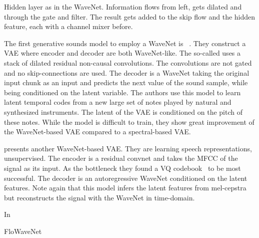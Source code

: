 \begin{marginfigure}
    
    \caption{Hidden layer as in the WaveNet. Information flows from left, gets dilated and through the gate and filter. The result gets added to the skip flow and the hidden feature, each with a channel mixer before.}%
    \label{fig:wavenet_layer}
\end{marginfigure}


The first generative sounds model to employ a WaveNet is ~\cite{kalchbrennerEfficient2018}. They construct a VAE where encoder and decoder are both WaveNet-like. The so-called  uses a stack of dilated residual non-causal convolutions. The convolutions are not gated and no skip-connections are used. The decoder is a WaveNet taking the original input chunk as an input and predicts the next value of the sound sample, while being conditioned on the latent variable. The authors use this model to learn latent temporal codes from a new large set of notes played by natural and synthesized instruments. The latent of the VAE is conditioned on the pitch of these notes. While the model is difficult to train, they show great improvement of the WaveNet-based VAE compared to a spectral-based VAE.

\textcite{chorowskiUnsupervised2019} presents another WaveNet-based VAE. They are learning speech representations, unsupervised. The encoder is a residual convnet and takes the MFCC of the signal as its input. As the bottleneck they found a VQ codebook~\cite{vandenoordNeural2017} to be most successful. The decoder is an autoregressive WaveNet conditioned on the latent features. Note again that this model infers the latent features from mel-cepstra but reconstructs the signal with the WaveNet in time-domain.

In~\textcite{prengerWaveGlow2018}

FloWaveNet~\textcite{kimFloWaveNet2019a}
